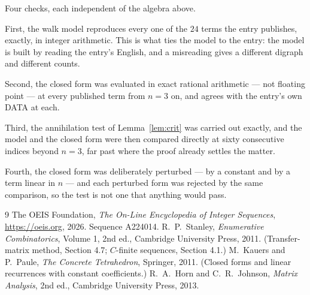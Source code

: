 \documentclass[11pt,a4paper]{article}
\theoremstyle{plain}
\theoremstyle{definition}
\begin{document}
Four checks, each independent of the algebra above.

First, the walk model reproduces every one of the $24$ terms the entry publishes,
exactly, in integer arithmetic. This is what ties the model to the entry: the model is built
by reading the entry's English, and a misreading gives a different digraph and different
counts.

Second, the closed form was evaluated in exact rational arithmetic --- not floating point ---
at every published term from $n=3$ on, and agrees with the entry's own DATA at each.

Third, the annihilation test of Lemma~\ref{lem:crit} was carried out exactly, and the model
and the closed form were then compared directly at sixty consecutive indices beyond
$n=3$, far past where the proof already settles the matter.

Fourth, the closed form was deliberately perturbed --- by a constant and by a term linear in
$n$ --- and each perturbed form was rejected by the same comparison, so the test is not one
that anything would pass.

\begin{thebibliography}{9}
 The OEIS Foundation, \emph{The On-Line Encyclopedia of Integer
Sequences}, \url{https://oeis.org}, 2026. Sequence A224014.
 R.~P.~Stanley, \emph{Enumerative Combinatorics}, Volume 1, 2nd ed.,
Cambridge University Press, 2011. (Transfer-matrix method, Section 4.7; $C$-finite sequences,
Section 4.1.)
 M.~Kauers and P.~Paule, \emph{The Concrete Tetrahedron}, Springer, 2011.
(Closed forms and linear recurrences with constant coefficients.)
 R.~A.~Horn and C.~R.~Johnson, \emph{Matrix Analysis}, 2nd ed., Cambridge
University Press, 2013.
\end{thebibliography}
\end{document}
